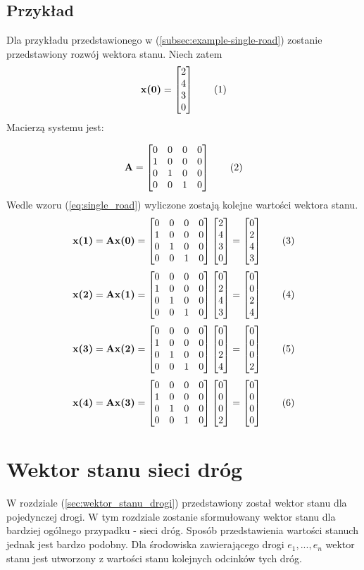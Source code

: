 \documentclass[12pt]{book}
\theoremstyle{plain}
\newcommand\addtag{\refstepcounter{equation}
\renewcommand{\labelenumii}{\theenumii}
\renewcommand{\theenumii}{\theenumi.\arabic{enumii}.}
\tag{\theequation}}
\begin{document}
\subsection{Przykład}
Dla przykładu przedstawionego w (\ref{subsec:example-single-road}) zostanie przedstawiony rozwój wektora stanu. Niech zatem
\def \xZero {\begin{bmatrix}
	2 \\ 4 \\ 3 \\ 0
	\end{bmatrix}}
\[\textbf{x(0)}=\xZero \addtag \]
Macierzą systemu jest:
\def \A {\begin{bmatrix}
		0 & 0 & 0 & 0 \\
		1 & 0 & 0 & 0 \\
		0 & 1 & 0 & 0 \\
		0 & 0 & 1 & 0 \\
\end{bmatrix}}

\[
\textbf{A}=\A \addtag
\]
Wedle wzoru (\ref{eq:single_road}) wyliczone zostają kolejne wartości wektora stanu.
\def \xI {\begin{bmatrix}
		0 \\ 2 \\ 4 \\ 3
\end{bmatrix}}
\[
\textbf{x(1)}=\textbf{Ax(0)}=\A \xZero = \xI \addtag
\]
\def \xII {\begin{bmatrix}
		0 \\ 0 \\ 2 \\ 4
\end{bmatrix}}
\[
\textbf{x(2)}=\textbf{Ax(1)}=\A \xI = \xII \addtag
\]
\def \xIII {\begin{bmatrix}
		0 \\ 0 \\ 0 \\ 2
\end{bmatrix}}
\[
\textbf{x(3)}=\textbf{Ax(2)}=\A \xII = \xIII \addtag
\]
\def \xIV {\begin{bmatrix}
		0 \\ 0 \\ 0 \\ 0
\end{bmatrix}}
\[
\textbf{x(4)}=\textbf{Ax(3)}=\A \xIII = \xIV \addtag
\]

\section {Wektor stanu sieci dróg}
W rozdziale (\ref{sec:wektor_stanu_drogi}) przedstawiony został wektor stanu dla pojedynczej drogi. W tym rozdziale zostanie sformułowany wektor stanu dla bardziej ogólnego przypadku - sieci dróg. Sposób przedstawienia wartości stanuch jednak jest bardzo podobny. Dla środowiska zawierającego drogi $e_1,...,e_n$ wektor stanu jest utworzony z wartości stanu kolejnych odcinków tych dróg. 
\end{document}
